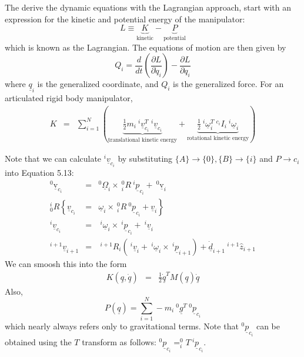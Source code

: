 \documentclass[fleqn]{article}
\begin{document}
The derive the dynamic equations with the Lagrangian approach, start with an expression for the kinetic and potential energy of the manipulator:
\begin{displaymath}
L \equiv \underbrace{K}_{\text{kinetic}} - \underbrace{P}_{\text{potential}}
\end{displaymath}
which is known as the Lagrangian. The equations of motion are then given by
\begin{equation}
Q_{i} = \frac{d}{dt}\left(\frac{\partial L}{\partial \dot{q}_{i}}\right) - \frac{\partial L}{\partial q_{i}} \label{Lagrangian_deriv}
\end{equation}
where $\underline{q}_{i}$ is the generalized coordinate, and $Q_{i}$ is the generalized force. For an articulated rigid body manipulator,
\begin{eqnarray}
K & = &\sum_{i=1}^{N}\left( \underbrace{\frac{1}{2}m_{i}\ ^{i}\underline{v}_{c_{i}}^{T}\ ^{i}\underline{v}_{c_{i}}}_{\text{translational kinetic energy}} + \underbrace{\frac{1}{2}\ ^{i}\underline{\omega}_{i}^{T}\ ^{c_{i}}I_{i}\ ^{i}\underline{\omega}_{i}}_{\text{rotational kinetic energy}} \right) \nonumber
\end{eqnarray}

Note that we can calculate $^{i}\underline{v}_{c_{i}}$ by substituting $\{A\} \rightarrow \{0\}, \{B\} \rightarrow \{i\}$ and $P\rightarrow c_{i}$ into Equation 5.13:
\begin{eqnarray}
^{0}\underline{\mathrm{v}}_{c_{i}} & = & ^{0}\underline{\Omega}_{i}\times\ ^{0}_{i}R\ ^{i}\underline{p}_{c_{i}} + \ ^{0}\underline{\mathrm{v}}_{i} \nonumber \\
^{i}_{0}R\left\{ \underline{v}_{c_{i}} \right. & = & \left. \underline{\omega}_{i}\times\ ^{0}_{i}R\ ^{0}\underline{p}_{c_{i}}+\underline{v}_{i} \right\} \nonumber \\
^{i}\underline{v}_{c_{i}} & = & \ ^{i}\underline{\omega}_{i} \times\ ^{i}\underline{p}_{c_{i}} + \ ^{i}\underline{v}_{i} \nonumber \\
^{i+1}\underline{v}_{i+1} & = & \ ^{i+1}R_{i}\left(\ ^{i}\underline{v}_{i} + \ ^{i}\underline{\omega}_{i}\times\ ^{i}\underline{p}_{i+1}\right) + \underline{\dot{d}}_{i+1}\ ^{i+1}\hat{z}_{i+1} \nonumber
\end{eqnarray}
We can smoosh this into the form
\begin{eqnarray}
K\!\left(\underline{q}, \underline{\dot{q}}\right) & = & \frac{1}{2}\underline{\dot{q}}^{T}M(\underline{q})\underline{\dot{q}}  \nonumber
\end{eqnarray}
Also,
\begin{equation}
P(\underline{q}) = \sum_{i=1}^{N} -m_{i}\ ^{0}\underline{g}^{T}\ ^{0}\underline{p}_{c_{i}} \nonumber
\end{equation}
which nearly always refers only to gravitational terms. Note that $^{0}\underline{p}_{c_{i}}$ can be obtained using the $T$ transform as follows: $^{0}\underline{p}_{c_{i}} = ^{0}_{i}T\ ^{i}\underline{p}_{c_{i}}$.
\end{document}
